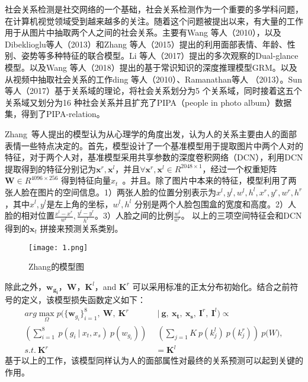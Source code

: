 社会关系检测是社交网络的一个基础，社会关系检测作为一个重要的多学科问题，在计算机视觉领域受到越来越多的关注。随着这个问题被提出以来，有大量的工作用于从图片中抽取两个人之间的社会关系。主要有Wang 等人（2010）\cite{wang2010seeing}，以及Dibeklioglu等人（2013）\cite{dibeklioglu2013like}和Zhang 等人（2015）\cite{zhang2015learning}提出的利用面部表情、年龄、性别、姿势等多种特征的联合模型。Li 等人（2017）\cite{li2017dual-glance}提出的多次观察的Dual-glance模型。以及Wang 等人（2018）\cite{wang2018deep}提出的基于常识知识的深度推理模型GRM。以及从视频中抽取社会关系的工作ding 等人（2010）\cite{ding2010learning}、Ramanathan等人 （2013）\cite{ramanathan2013social}。Sun等人（2017）\cite{sun2017a}基于关系域的理论，将社会关系划分为5 个关系域，同时接着这五个关系域又划分为16 种社会关系并且扩充了PIPA（people in photo album）数据集\cite{zhang2015beyond}，得到了PIPA-relation。

Zhang~等人\cite{zhang2015learning}提出的模型认为从心理学的角度出发，认为人的关系主要由人的面部表情一些特点决定的。首先，模型设计了一个基准模型用于提取图片中两个人对的特征，对于两个人对，基准模型采用共享参数的深度卷积网络（DCN），利用DCN 提取得到的特征分别记为$\mathbf{x}^r,\mathbf{x}^l$，并且$\forall \mathbf{x}^r,\mathbf{x}^l \in R^{2048 \times 1}$，经过一个权重矩阵$\mathbf{W} \in R^{4096 \times 256}$ 得到特征向量$x_t$~。并且。除了图片中本来的特征，模型利用了两张人脸在图片的空间信息。1）两张人脸的位置分别表示为${x^l,y^l,w^l,h^l,x^r,y^r,w^r,h^r}$，其中$x^l,y^l$是左上角的坐标，$w^l,h^l$ 分别是两个人脸包围盒的宽度和高度。2）人脸的相对位置$\frac{x^l-x^r}{w^l},\frac{y^l-y^r}{h^l}$。3）人脸之间的比例$\frac{w^l}{w^r}$。 以上的三项空间特征会和DCN 得到的$\mathbf{x}_t$ 拼接来预测关系类别。
\begin{figure}[htpb]
	\centering
	\texttt{[image: 1.png]}
    \caption{Zhang\cite{zhang2015learning}的模型图}
	\vspace*{-3.5mm}
	\label{fig:model_zhang}
\end{figure}
除此之外，$\mathbf{w_{g_{i}}}$，$\mathbf{W}$，$\mathbf{K}^l$，and $\mathbf{K}^r$ 可以采用标准的正太分布初始化。结合之前符号的定义，该模型损失函数定义如下：
\begin{equation}
\begin{split}
     arg\max \limits_{\Omega} p(\{\mathbf{w}_{g_{i}}\}_{i=1}^8, ~\mathbf{W}, ~\mathbf{K}^r & ~|~ \mathbf{g},~\mathbf{x_t},~\mathbf{x_s},~\mathbf{I}^r,~\mathbf{I}^l) \propto \\
     (\sum_{i=1}^{8}~p(g_i~|~x_t,x_s)~p(w_{g_i}))~ & ~(\sum_{j=1}{K}~p(k_j^l)~p(k_j^r))~p\mathbf(W), \\
     s.t. ~\mathbf{K}^r &= \mathbf{K}^l
\end{split}
\end{equation}
基于以上的工作，该模型同样认为人的面部属性对最终的关系预测可以起到关键的作用。

